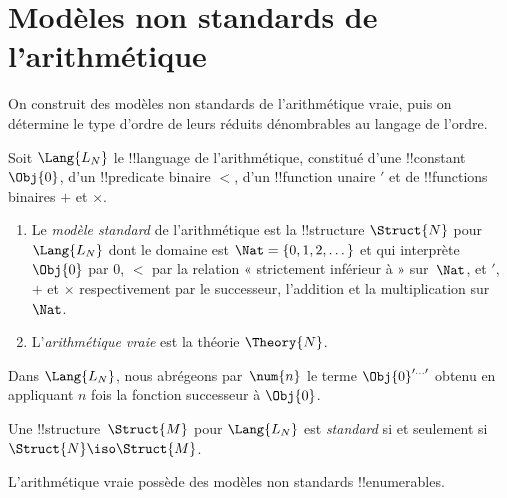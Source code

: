 \documentclass[../../../include/open-logic-section]{subfiles}
\begin{document}
\section{Modèles non standards de l'arithmétique}

On construit des modèles non standards de l'arithmétique vraie,
puis on détermine le type d'ordre de leurs réduits dénombrables
au langage de l'ordre.













\begin{defn}
Soit $\Lang{L_N}$ le !!{language} de l'arithmétique, constitué d'une
!!{constant} $\Obj{0}$, d'un !!{predicate} binaire $<$, d'un
!!{function} unaire $\prime$ et de !!{function}s binaires
$+$ et $\times$.
\begin{enumerate}
\item Le \emph{modèle standard} de l'arithmétique est la !!{structure}
  $\Struct{N}$ pour $\Lang{L_N}$ dont le domaine est
  $\Nat = \{ 0, 1, 2, \dots\}$ et qui interprète $\Obj{0}$ par $0$,
  $<$ par la relation « strictement inférieur à » sur~$\Nat$,
  et $\prime$, $+$ et $\times$ respectivement par le successeur,
  l'addition et la multiplication sur $\Nat$.
\item L'\emph{arithmétique vraie} est la théorie $\Theory{N}$.
\end{enumerate}
\end{defn}

Dans $\Lang{L_N}$, nous abrégeons par~$\num{n}$ le terme
$\Obj{0}^{\prime\dots\prime}$ obtenu en appliquant $n$ fois la
fonction successeur à $\Obj{0}$.

\begin{defn}
Une !!{structure}~$\Struct{M}$ pour $\Lang{L_N}$ est \emph{standard}
si et seulement si $\Struct{N} \iso \Struct{M}$.
\end{defn}

\begin{thm}
L'arithmétique vraie possède des modèles non standards !!{enumerable}s.
\end{thm}
\end{document}
